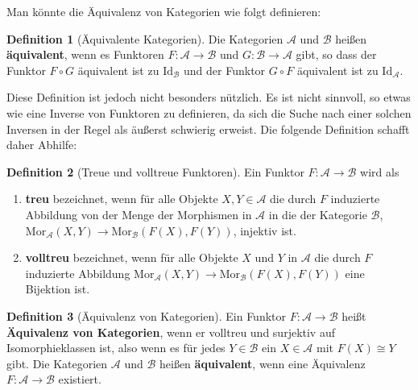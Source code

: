 \documentclass[leqno]{article}
\theoremstyle{plain}
\theoremstyle{definition}
\newtheorem{defn}{Definition}[section]
\theoremstyle{remark}
\begin{document}
Man könnte die Äquivalenz von Kategorien wie folgt definieren:

\begin{defn}[Äquivalente Kategorien]
Die Kategorien $\mathcal{A}$ und $\mathcal{B}$ heißen \textbf{äquivalent}, wenn es Funktoren $F: \mathcal{A} \rightarrow \mathcal{B}$ und $G: \mathcal{B} \rightarrow \mathcal{A}$ gibt, so dass der Funktor $F \circ G$ äquivalent ist zu $\text{Id}_{\mathcal{B}}$ und der Funktor $G \circ F$ äquivalent ist zu $\text{Id}_\mathcal{A}$.
\end{defn}

Diese Definition ist jedoch nicht besonders nützlich. Es ist nicht sinnvoll, so etwas wie eine Inverse von Funktoren zu definieren, da sich die Suche nach einer solchen Inversen in der Regel als äußerst schwierig erweist. Die folgende Definition schafft daher Abhilfe:

\begin{defn}[Treue und volltreue Funktoren]
Ein Funktor $F: \mathcal{A} \rightarrow \mathcal{B}$ wird als
\begin{enumerate}
	\item \textbf{treu} bezeichnet, wenn für alle Objekte $X,Y \in \mathcal{A}$ die durch $F$ induzierte Abbildung von der Menge der Morphismen in $\mathcal{A}$ in die der Kategorie $\mathcal{B}$, $\text{Mor}_\mathcal{A}(X,Y) \rightarrow \text{Mor}_\mathcal{B}(F(X),F(Y))$, injektiv ist.
	\item \textbf{volltreu} bezeichnet, wenn für alle Objekte $X$ und $Y$ in $\mathcal{A}$ die durch $F$ induzierte Abbildung $\text{Mor}_\mathcal{A}(X,Y) \rightarrow \text{Mor}_\mathcal{B}(F(X),F(Y))$ eine Bijektion ist.
\end{enumerate}
\end{defn}

\begin{defn}[Äquivalenz von Kategorien]
Ein Funktor $F: \mathcal{A} \rightarrow \mathcal{B}$ heißt \textbf{Äquivalenz von Kategorien}, wenn er volltreu und surjektiv auf Isomorphieklassen ist, also wenn es für jedes $Y \in \mathcal{B}$ ein $X \in \mathcal{A}$ mit $F(X) \cong Y$ gibt. Die Kategorien $\mathcal{A}$ und $\mathcal{B}$ heißen \textbf{äquivalent}, wenn eine Äquivalenz $F: \mathcal{A} \rightarrow \mathcal{B}$ existiert.
\end{defn}
\end{document}
